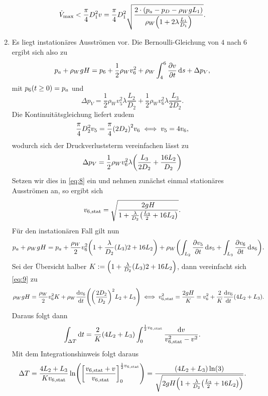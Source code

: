 \documentclass{exercise}
\begin{document}
\begin{enumerate}
        \[
            \dot{V}_{\text{max}} < \frac{\pi}{4}D_1^2 v = \frac{\pi}{4}D_1^2\sqrt{\frac{2 \cdot \parentheses*{p_a - p_D - \rho_W gL_1}}{\rho_W \parentheses*{1 + 2\lambda\frac{L_1}{D_1}}}}.
        \]
        \item Es liegt instationäres Ausströmen vor.
        Die Bernoulli-Gleichung von \(4\) nach \(6\) ergibt sich also zu
        \begin{equation}\label{eq:8}
            p_a + \rho_W gH = p_6 + \frac{1}{2}\rho_W v_6^2 + \rho_W \int_4^6 \frac{\partial v}{\partial t}\mathop{\mathrm{d}\!} s + \Delta p_V,
        \end{equation}
        mit \(p_6\parentheses*{t \ge 0} = p_a\) und
        \[
            \Delta p_V = \frac{1}{2}\rho_W v_5^2 \lambda\frac{L_2}{D_2} + \frac{1}{2}\rho_W v_6^2 \lambda\frac{L_3}{2D_2}.
        \]
        Die Kontinuitätsgleichung liefert zudem
        \[
            \frac{\pi}{4}D_2^2 v_5 = \frac{\pi}{4}\parentheses*{2D_2}^2 v_6 \iff v_5 = 4v_6,
        \]
        wodurch sich der Druckverluststerm vereinfachen lässt zu
        \[
            \Delta p_V = \frac{1}{2}\rho_W v_6^2 \lambda\parentheses*{\frac{L_3}{2D_2} + \frac{16L_2}{D_2}}
        \]
        Setzen wir dies in \eqref{eq:8} ein und nehmen zunächst einmal stationäres Ausströmen an, so ergibt sich
        \[
            v_{6, \text{stat}} = \sqrt{\frac{2gH}{1 + \frac{\lambda}{D_2}\parentheses*{\frac{L_3}{2} + 16L_2}}}.
        \]
        Für den instationären Fall gilt nun
        \begin{equation}\label{eq:9}
            p_a + \rho_W gH = p_a + \frac{\rho_W}{2}v_6^2 \parentheses*{1 + \frac{\lambda}{D_2}\parentheses*{L_3}{2} + 16L_2} + \rho_W \parentheses*{\int_{L_2}\frac{\partial v_5}{\partial t}\d s_5 + \int_{L_3}\frac{\partial v_6}{\partial t}\d s_6}.
        \end{equation}
        Sei der Übersicht halber \(K := \parentheses*{1 + \frac{\lambda}{D_2}\parentheses*{L_3}{2} + 16L_2}\), dann vereinfacht sich \eqref{eq:9} zu
        \[
            \rho_W gH = \frac{\rho_W}{2}v_6^2 K + \rho_W \frac{\d v_6}{\d t}\parentheses*{\parentheses*{\frac{2D_2}{D_2}}^2 L_2 + L_3} \iff v_{6, \text{stat}}^2 = \frac{2gH}{K} = v_6^2 + \frac{2}{K}\frac{\d v_6}{\d t}\parentheses*{4L_2 + L_3}.
        \]
        Daraus folgt dann
        \[
            \int_{\Delta T}\d t = \frac{2}{K}\parentheses*{4L_2 + L_3}\int_0^{\frac{1}{2}v_{6, \text{stat}}}\frac{\d v}{v_{6, \text{stat}}^2 - v^2}.
        \]
        Mit dem Integrationshinweis folgt daraus
        \[
            \Delta T = \frac{4L_2 + L_3}{Kv_{6, \text{stat}}}\ln\parentheses*{\brackets*{\frac{v_{6, \text{stat}} + v}{v_{6, \text{stat}}}}_0^{\frac{1}{2}v_{6, \text{stat}}}} = \frac{\parentheses*{4L_2 + L_3}\ln\parentheses*{3}}{\sqrt{2gH\parentheses*{1 + \frac{\lambda}{D_2}\parentheses*{\frac{L_3}{2} + 16L_2}}}}.
        \]
    \end{enumerate}
\end{document}
